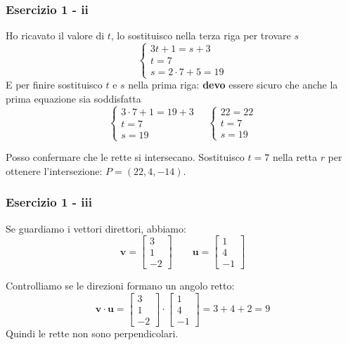 \documentclass{beamer}
\begin{document}
\begin{frame}
    \frametitle{Esercizio 1 - ii}
    Ho ricavato il valore di $t$, lo sostituisco nella terza riga per trovare $s$
$$
    \left\{\begin{array}{l}
          3t+1=s+3\\
          t=7\\
          s=2\cdot7+5 = 19
         \end{array}\right . 
$$
    E per finire sostituisco $t$ e $s$ nella prima riga: \textbf{devo} essere sicuro che anche la prima equazione sia soddisfatta
$$
    \left\{\begin{array}{l}
          3\cdot7 + 1 = 19 + 3 \\
          t=7\\
          s=19
         \end{array}\right . 
    \quad
    \left\{\begin{array}{l}
          22=22\\
          t= 7\\
          s= 19
         \end{array}\right . 
$$

Posso confermare che le rette si intersecano.
Sostituisco $t=7$ nella retta $r$ per ottenere l'intersezione: $P=(22,4,-14)$.

\end{frame}

\begin{frame}
\frametitle{Esercizio 1 - iii}

Se guardiamo i vettori direttori, abbiamo:
$$
\mathbf{v} = \left[
\begin{array}{c}
3\\
1\\
-2
\end{array}
\right]
\qquad
    \mathbf{u} = \left[
\begin{array}{c}
1\\
4\\
-1
\end{array}
\right]
$$

Controlliamo se le direzioni formano un angolo retto:
$$
    \mathbf{v} \cdot \mathbf{u}
    =
    \left[
\begin{array}{c}
3\\
1\\
-2
\end{array}
\right]
\cdot
\left[
\begin{array}{c}
1\\
4\\
-1
\end{array}
\right]
= 3 + 4 + 2 = 9
$$
Quindi le rette non sono perpendicolari.
\end{frame}
\end{document}
